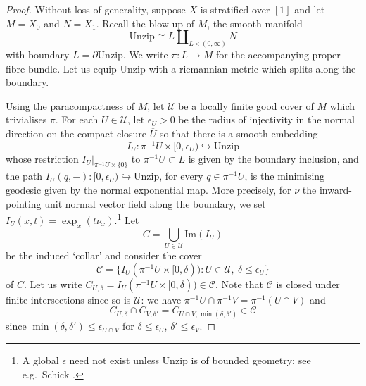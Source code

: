 \documentclass[]{amsart}
\newcommand{\mcal}[1]{\mathcal{#1}}
\newcommand{\mrm}[1]{\mathrm{#1}}
\numberwithin{equation}{section}
\theoremstyle{definition}
\theoremstyle{remark}
\theoremstyle{plain}
\begin{document}
\begin{proof}
    Without loss of generality, suppose $X$ is stratified over $[1]$ and let $M=X_0$ and $N=X_1$. Recall the blow-up of $M$, the smooth manifold
    \[
        \mrm{Unzip}\cong L\amalg_{L\times(0,\infty)}N
    \]
    with boundary $L=\partial\mrm{Unzip}$. We write $\pi\colon L\to M$ for the accompanying proper fibre bundle. Let us equip $\mrm{Unzip}$ with a riemannian metric which splits along the boundary.

    Using the paracompactness of $M$, let $\mcal{U}$ be a locally finite good cover of $M$ which trivialises $\pi$. For each $U\in\mcal{U}$, let $\epsilon_U>0$ be the radius of injectivity in the normal direction on the compact closure $\overline{U}$ so that there is a smooth embedding 
    \[
        I_U\colon \pi^{-1}U\times[0,\epsilon_U)\hookrightarrow \mrm{Unzip}
    \]
    whose restriction $I_U|_{\pi^{-1}U\times\{0\}}$ to $\pi^{-1}U\subset L$ is given by the boundary inclusion, and the path $I_U(q,-)\colon[0,\epsilon_U)\hookrightarrow \mrm{Unzip}$, for every $q\in\pi^{-1}U$, is the minimising geodesic given by the normal exponential map. More precisely, for $\nu$ the inward-pointing unit normal vector field along the boundary, we set $I_U(x,t)=\exp_x(t\nu_x)$.\footnote{A global $\epsilon$ need not exist unless $\mrm{Unzip}$ is of bounded geometry; see e.g.\ Schick \cite{schick2001bounded}.} Let 
    \[
        C=\bigcup_{U\in\mcal{U}}\mrm{Im}(I_U)
    \]
    be the induced `collar' and consider the cover
    \[  
        \mcal{C}=\{I_U(\pi^{-1}U\times[0,\delta)) : U\in\mcal{U},\ \delta\leq\epsilon_U\}
    \]
    of $C$. Let us write $C_{U,\delta}=I_U(\pi^{-1}U\times[0,\delta))\in\mcal{C}$. Note that $\mcal{C}$ is closed under finite intersections since so is $\mcal{U}$: we have $\pi^{-1}U\cap\pi^{-1}V=\pi^{-1}(U\cap V)$ and
    \[
        C_{U,\delta}\cap C_{V,\delta'}=C_{U\cap V,\min(\delta,\delta')}\in\mcal{C}
    \] 
    since $\min(\delta,\delta')\leq\epsilon_{U\cap V}$ for $\delta\leq\epsilon_U$, $\delta'\leq\epsilon_V$.
    

\end{proof}
\end{document}
